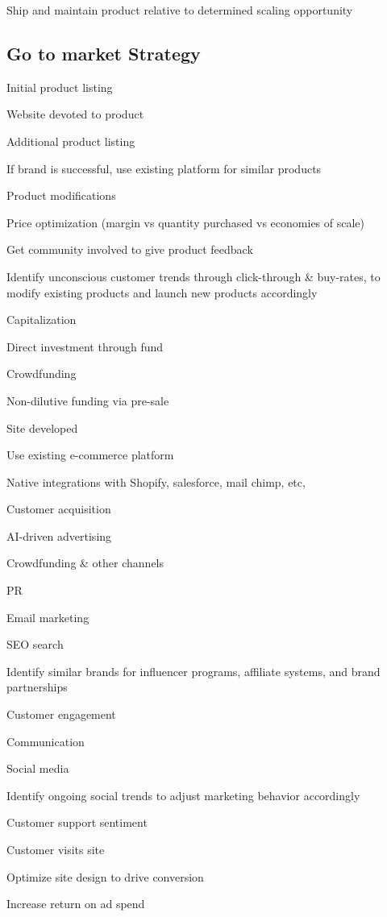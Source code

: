 \documentclass[11pt]{article}
\begin{document}
Ship and maintain product relative to determined scaling opportunity


\subsection{Go to market Strategy}

Initial product listing


Website devoted to product


Additional product listing


If brand is successful, use existing platform for similar products


Product modifications


Price optimization (margin vs quantity purchased vs economies of scale)


Get community involved to give product feedback


Identify unconscious customer trends through click-through \& buy-rates, to modify existing products and launch new products accordingly


Capitalization


Direct investment through fund


Crowdfunding


Non-dilutive funding via pre-sale


Site developed


Use existing e-commerce platform


Native integrations with Shopify, salesforce, mail chimp, etc,


Customer acquisition


AI-driven advertising


Crowdfunding \& other channels


PR


Email marketing


SEO search


Identify similar brands for influencer programs, affiliate systems, and brand partnerships


Customer engagement


Communication


Social media


Identify ongoing social trends to adjust marketing behavior accordingly


Customer support sentiment


Customer visits site


Optimize site design to drive conversion


Increase return on ad spend
\end{document}
